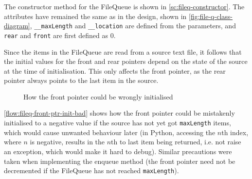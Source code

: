         The constructor method for the FileQueue is shown in \autoref{sc:fileq-constructor}. The attributes have remained the same as in the design, shown in \autoref{fig:file-q-class-diagram}, \verb|__maxLength| and \verb|__location| are defined from the parameters, and \verb|rear| and \verb|front| are first defined as 0. 

        Since the items in the FileQueue are read from a source text file, it follows that the initial values for the front and rear pointers depend on the state of the source at the time of initialisation. This only affects the front pointer, as the rear pointer always points to the last item in the source. 

        \begin{figure}[!ht]
            \centering
            \caption{How the front pointer could be wrongly initialised}
            \label{flow:fileq-front-ptr-init-bad}
        \end{figure}

        \autoref{flow:fileq-front-ptr-init-bad} shows how the front pointer could be mistakenly initialised to a negative value if the source has not yet got \verb|maxLength| items, which would cause unwanted behaviour later (in Python, accessing the $n$th index, where $n$ is negative, results in the $n$th to last item being returned, i.e. not raise an exception, which would make it hard to debug). Similar precautions were taken when implementing the enqueue method (the front pointer need not be decremented if the FileQueue has not reached \verb|maxLength|).


